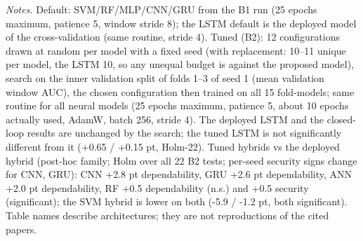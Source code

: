 \begin{table}[t]
\vspace{3pt}\par\raggedright\scriptsize\textit{Notes.} Default: SVM/RF/MLP/CNN/GRU from the B1 run (25 epochs maximum, patience 5, window stride 8); the LSTM default is the deployed model of the cross-validation (same routine, stride 4). Tuned (B2): 12 configurations drawn at random per model with a fixed seed (with replacement: 10--11 unique per model, the LSTM 10, so any unequal budget is against the proposed model), search on the inner validation split of folds 1--3 of seed 1 (mean validation window AUC), the chosen configuration then trained on all 15 fold-models; same routine for all neural models (25 epochs maximum, patience 5, about 10 epochs actually used, AdamW, batch 256, stride 4). The deployed LSTM and the closed-loop results are unchanged by the search; the tuned LSTM is not significantly different from it (+0.65 / +0.15 pt, Holm-22). Tuned hybrids vs the deployed hybrid (post-hoc family; Holm over all 22 B2 tests; per-seed security signs change for CNN, GRU): CNN +2.8 pt dependability, GRU +2.6 pt dependability, ANN +2.0 pt dependability, RF +0.5 dependability (n.s.) and +0.5 security (significant); the SVM hybrid is lower on both (-5.9 / -1.2 pt, both significant). Table names describe architectures; they are not reproductions of the cited papers.
\end{table}